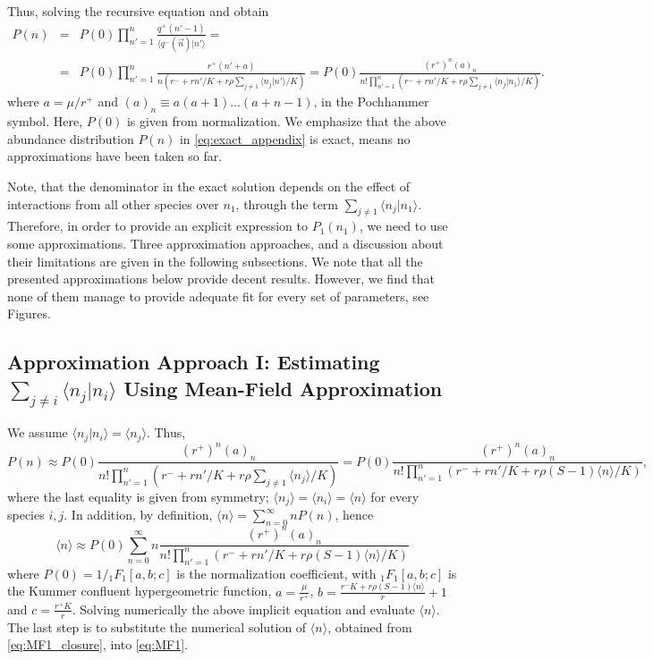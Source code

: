 \documentclass[9pt,twoside,lineno]{pnas-new}
\begin{document}
Thus, solving the recursive equation and obtain
\begin{eqnarray}
    P(n)&=&P(0)\prod_{n'=1}^{n}\frac{q^{+}(n'-1)}{\langle q^-(\vec{n})|n'\rangle}= \label{eq:exact_appendix}
    \\ \nonumber
    &=&P(0)\prod_{n'=1}^{n}\frac{r^+(n'+a)}{n\left(r^-+r n'/K + r\rho \sum_{j\neq 1 }\langle n_j |n'\rangle /K \right)}= P(0)\frac{(r^+)^{n}(a)_{n}}{n!\prod_{n'=1}^{n}\left(r^-+r n'/K + r\rho \sum_{j\neq 1 }\langle n_j |n_1\rangle /K \right)}.
\end{eqnarray}
where
 $a=\mu/r^+$ and $(a)_{n} \equiv a(a+1)\dots (a+n-1)$, in the Pochhammer symbol.  Here, $P(0)$ is given from normalization.
We emphasize that the above abundance distribution $P(n)$ in \eqref{eq:exact_appendix} is exact, means no approximations have been taken so far.

Note, that the denominator in the exact solution depends on the effect of interactions from all other species over $n_1$,  through the term $\sum_{j\neq 1}\langle n_j |n_1 \rangle $. Therefore, in order to provide an explicit expression to $P_1(n_1)$, we need to use some approximations. Three approximation approaches, and a discussion about their limitations are given in the following subsections. We note that all the presented approximations below provide decent results. However, we find that  none of them manage to provide adequate fit for every set of parameters, see Figures.  

\subsection*{Approximation Approach I: Estimating $\sum_{j\neq i}\langle n_j|n_i\rangle $ Using Mean-Field Approximation }
We assume $\langle n_j |n_i \rangle = \langle n_j \rangle $. Thus, 
\begin{equation}
    P(n)\approx P(0)\frac{(r^+)^{n}(a)_{n}}{n!\prod_{n'=1}^{n}\left(r^-+r n'/K + r\rho \sum_{j\neq 1 }\langle n_j\rangle /K \right)} = P(0)\frac{(r^+)^{n}(a)_{n}}{n!\prod_{n'=1}^{n}\left(r^-+r n'/K + r\rho (S-1)\langle n\rangle /K \right)},
    \label{eq:MF1}
\end{equation}
where the last equality is given from symmetry;  $\langle n_j \rangle = \langle n_i \rangle = \langle n\rangle $ for every species $i,j$. In addition, by definition, $\langle n \rangle = \sum_{n=0}^{\infty }n P(n)$, hence
\begin{equation}
    \langle n \rangle \approx P(0)\sum_{n=0}^{\infty}n\frac{(r^+)^{n}(a)_{n}}{n!\prod_{n'=1}^{n}\left(r^-+r n'/K + r\rho (S-1)\langle n\rangle /K \right)}
    \label{eq:MF1_closure}
\end{equation}
where $P(0)=1/{_1}F_1[a,b;c]$ is the normalization coefficient,  with ${_1}F_1[a,b;c]$ is the Kummer confluent hypergeometric function, $a=\frac{\mu}{r^+}$, $b=\frac{r^- K + r \rho (S-1) \langle n \rangle }{r}+1$ and $c=\frac{r^+ K}{r}$. Solving numerically the above implicit equation and evaluate $\langle n\rangle$. The last step is to substitute the numerical solution of $\langle n\rangle$, obtained from \eqref{eq:MF1_closure}, into \eqref{eq:MF1}.    
\end{document}
